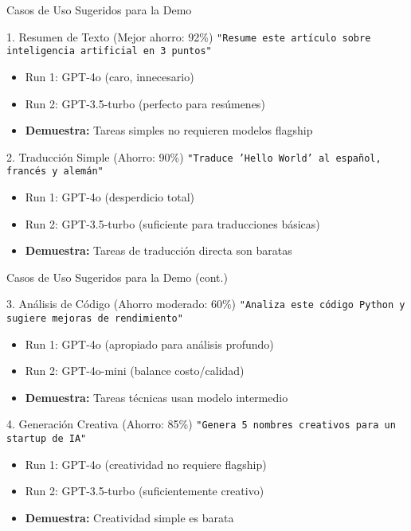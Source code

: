 \documentclass[aspectratio=169,11pt]{beamer}
\begin{document}
\begin{frame}{Casos de Uso Sugeridos para la Demo}
\begin{block}{1. Resumen de Texto (Mejor ahorro: 92\%)}
\texttt{"Resume este artículo sobre inteligencia artificial en 3 puntos"}
\begin{itemize}
    \item \textcolor{kavakred}{Run 1:} GPT-4o (caro, innecesario)
    \item \textcolor{kavakgreen}{Run 2:} GPT-3.5-turbo (perfecto para resúmenes)
    \item \textbf{Demuestra:} Tareas simples no requieren modelos flagship
\end{itemize}
\end{block}

\vspace{0.3cm}

\begin{block}{2. Traducción Simple (Ahorro: 90\%)}
\texttt{"Traduce 'Hello World' al español, francés y alemán"}
\begin{itemize}
    \item \textcolor{kavakred}{Run 1:} GPT-4o (desperdicio total)
    \item \textcolor{kavakgreen}{Run 2:} GPT-3.5-turbo (suficiente para traducciones básicas)
    \item \textbf{Demuestra:} Tareas de traducción directa son baratas
\end{itemize}
\end{block}
\end{frame}

\begin{frame}{Casos de Uso Sugeridos para la Demo (cont.)}
\begin{block}{3. Análisis de Código (Ahorro moderado: 60\%)}
\texttt{"Analiza este código Python y sugiere mejoras de rendimiento"}
\begin{itemize}
    \item \textcolor{kavakred}{Run 1:} GPT-4o (apropiado para análisis profundo)
    \item \textcolor{kavakorange}{Run 2:} GPT-4o-mini (balance costo/calidad)
    \item \textbf{Demuestra:} Tareas técnicas usan modelo intermedio
\end{itemize}
\end{block}

\vspace{0.3cm}

\begin{block}{4. Generación Creativa (Ahorro: 85\%)}
\texttt{"Genera 5 nombres creativos para un startup de IA"}
\begin{itemize}
    \item \textcolor{kavakred}{Run 1:} GPT-4o (creatividad no requiere flagship)
    \item \textcolor{kavakgreen}{Run 2:} GPT-3.5-turbo (suficientemente creativo)
    \item \textbf{Demuestra:} Creatividad simple es barata
\end{itemize}
\end{block}
\end{frame}
\end{document}
